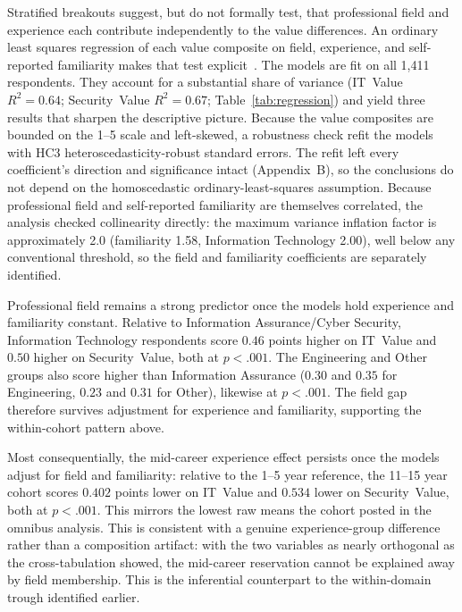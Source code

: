 Stratified breakouts suggest, but do not formally test, that professional field and experience each contribute independently to the value differences. An ordinary least squares regression of each value composite on field, experience, and self-reported familiarity makes that test explicit~\parencite{Cohen_Cohen_West_Aiken_2003}. The models are fit on all 1{,}411 respondents. They account for a substantial share of variance (IT~Value $R^2=0.64$; Security~Value $R^2=0.67$; Table~\ref{tab:regression}) and yield three results that sharpen the descriptive picture. Because the value composites are bounded on the 1--5 scale and left-skewed, a robustness check refit the models with HC3 heteroscedasticity-robust standard errors. The refit left every coefficient's direction and significance intact (Appendix~B), so the conclusions do not depend on the homoscedastic ordinary-least-squares assumption. Because professional field and self-reported familiarity are themselves correlated, the analysis checked collinearity directly: the maximum variance inflation factor is approximately 2.0 (familiarity 1.58, Information Technology 2.00), well below any conventional threshold, so the field and familiarity coefficients are separately identified.

Professional field remains a strong predictor once the models hold experience and familiarity constant. Relative to Information Assurance/Cyber Security, Information Technology respondents score $0.46$ points higher on IT~Value and $0.50$ higher on Security~Value, both at $p<.001$. The Engineering and Other groups also score higher than Information Assurance ($0.30$ and $0.35$ for Engineering, $0.23$ and $0.31$ for Other), likewise at $p<.001$. The field gap therefore survives adjustment for experience and familiarity, supporting the within-cohort pattern above.

Most consequentially, the mid-career experience effect persists once the models adjust for field and familiarity: relative to the 1--5 year reference, the 11--15 year cohort scores $0.402$ points lower on IT~Value and $0.534$ lower on Security~Value, both at $p<.001$. This mirrors the lowest raw means the cohort posted in the omnibus analysis. This is consistent with a genuine experience-group difference rather than a composition artifact: with the two variables as nearly orthogonal as the cross-tabulation showed, the mid-career reservation cannot be explained away by field membership. This is the inferential counterpart to the within-domain trough identified earlier.

